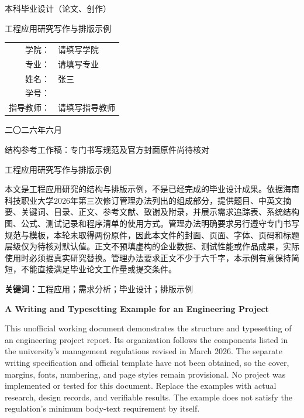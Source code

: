 \documentclass[12pt,a4paper,fontset=none]{ctexart}
\newcommand{\thesistitle}{工程应用研究写作与排版示例}
\newcommand{\thesistitleeng}{A Writing and Typesetting Example for an Engineering Project}
\newcommand{\thesisauthor}{张三}
\newcommand{\thesisid}{2022000001}
\newcommand{\thesiscollege}{请填写学院}
\newcommand{\thesismajor}{请填写专业}
\newcommand{\thesisadvisor}{请填写指导教师}
\begin{document}
\songti{}\setlength{\parindent}{2em}
\begin{titlepage}\thispagestyle{empty}\centering
{}\par\vspace{15mm}
{\heiti{}本科毕业设计（论文、创作）}\par\vspace{18mm}
{\heiti{}\thesistitle}\par\vspace{20mm}
\renewcommand{\arraystretch}{1.8}\begin{tabular}{r>{\raggedright\arraybackslash}p{.65\linewidth}}
学院：&\thesiscollege\\专业：&\thesismajor\\
姓名：&\thesisauthor\\学号：&\thesisid\\指导教师：&\thesisadvisor
\end{tabular}\vfill
二〇二六年六月\par\medskip
{\heiti{}结构参考工作稿：专门书写规范及官方封面原件尚待核对}
\end{titlepage}
\pagestyle{draftthesis}
\begin{center}{\heiti{}\thesistitle}\par{}\end{center}
本文是工程应用研究的结构与排版示例，不是已经完成的毕业设计成果。依据海南科技职业大学2026年第三次修订管理办法列出的组成部分，提供题目、中英文摘要、关键词、目录、正文、参考文献、致谢及附录，并展示需求追踪表、系统结构图、公式、测试记录和程序清单的使用方式。管理办法明确要求另行遵守专门书写规范与模板，本轮未取得两份原件，因此本文件的封面、页面、字体、页码和标题层级仅为待核对默认值。正文不预填虚构的企业数据、测试性能或作品成果，实际使用时必须据真实研究替换。管理办法要求正文不少于六千字，本示例有意保持简短，不能直接满足毕业论文工作量或提交条件。
\par\medskip\noindent\textbf{关键词：}工程应用；需求分析；毕业设计；排版示例
\clearpage{}
\begin{center}{\bfseries{}\thesistitleeng}\par{}\end{center}
This unofficial working document demonstrates the structure and typesetting of an engineering project report. Its organization follows the components listed in the university's management regulations revised in March 2026. The separate writing specification and official template have not been obtained, so the cover, margins, fonts, numbering, and page styles remain provisional. No project was implemented or tested for this document. Replace the examples with actual research, design records, and verifiable results. The example does not satisfy the regulation's minimum body-text requirement by itself.
\end{document}
